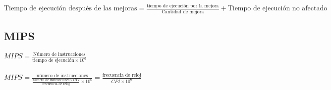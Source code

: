 \documentclass[11pt, letterpaper]{book}
\begin{document}
$\displaystyle\text{Tiempo de ejecución después de las mejoras} = \frac{\text{tiempo de ejecución por la mejora}}{\text{Cantidad de mejora}}+ \text{Tiempo de ejecución no afectado}$\\

\subsection{MIPS}

$\displaystyle MIPS=\frac{\text{Número de instrucciones}}{\text{tiempo de ejecución}\times 10^6}$\\\\

$\displaystyle MIPS=\frac{\text{número de instrucciones}}{\frac{\text{número de instrucciones}\times CPI}{\text{frecuencia de reloj}}\times 10^6} = \frac{\text{frecuencia de reloj}}{CPI\times 10^6}$
\end{document}
